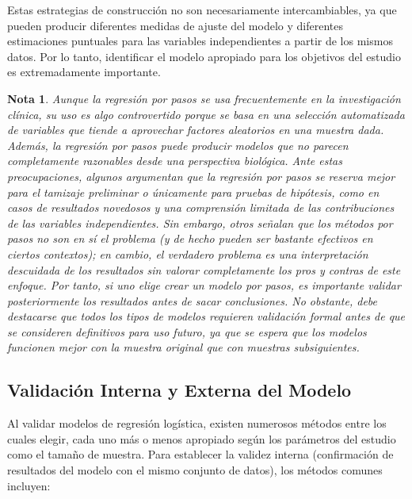 \documentclass[12pt]{article}
\newtheorem{Note}{Nota}%
\begin{document}
Estas estrategias de construcci\'on no son necesariamente intercambiables, ya que pueden producir diferentes medidas de ajuste del modelo y diferentes estimaciones puntuales para las variables independientes a partir de los mismos datos. Por lo tanto, identificar el modelo apropiado para los objetivos del estudio es extremadamente importante.

\begin{Note}
Aunque la regresi\'on por pasos se usa frecuentemente en la investigaci\'on cl\'inica, su uso es algo controvertido porque se basa en una selecci\'on automatizada de variables que tiende a aprovechar factores aleatorios en una muestra dada.  Adem\'as, la regresi\'on por pasos puede producir modelos que no parecen completamente razonables desde una perspectiva biol\'ogica. Ante estas preocupaciones, algunos argumentan que la regresi\'on por pasos se reserva mejor para el tamizaje preliminar o \'unicamente para pruebas de hip\'otesis, como en casos de resultados novedosos y una comprensi\'on limitada de las contribuciones de las variables independientes. Sin embargo, otros se\~nalan que los m\'etodos por pasos no son en s\'i el problema (y de hecho pueden ser bastante efectivos en ciertos contextos); en cambio, el verdadero problema es una interpretaci\'on descuidada de los resultados sin valorar completamente los pros y contras de este enfoque. Por tanto, si uno elige crear un modelo por pasos, es importante validar posteriormente los resultados antes de sacar conclusiones. No obstante, debe destacarse que todos los tipos de modelos requieren validaci\'on formal antes de que se consideren definitivos para uso futuro, ya que se espera que los modelos funcionen mejor con la muestra original que con muestras subsiguientes.\cite{darlington1990, tabachnick2007, hosmer2000}
\end{Note}

\subsection{Validaci\'on Interna y Externa del Modelo}

Al validar modelos de regresi\'on log\'istica, existen numerosos m\'etodos entre los cuales elegir, cada uno m\'as o menos apropiado seg\'un los par\'ametros del estudio como el tama\~no de muestra. Para establecer la validez interna (confirmaci\'on de resultados del modelo con el mismo conjunto de datos), los m\'etodos comunes incluyen: 
\end{document}
